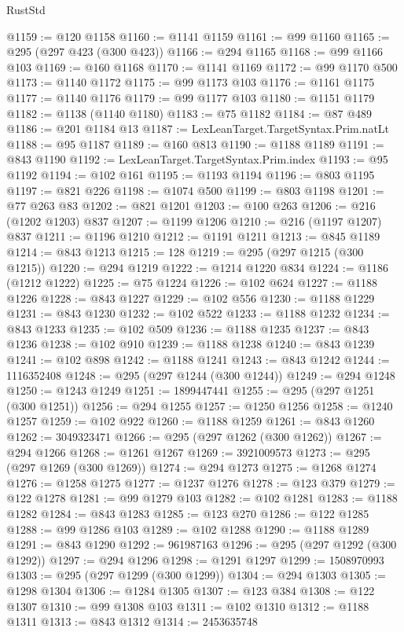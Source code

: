 \begin{lexlean}{RustStd}
\begin{coremodule}
@1159 := @120 @1158
@1160 := @1141 @1159
@1161 := @99 @1160
@1165 := @295 (@297 @423 (@300 @423))
@1166 := @294 @1165
@1168 := @99 @1166 @103
@1169 := @160 @1168
@1170 := @1141 @1169
@1172 := @99 @1170 @500
@1173 := @1140 @1172
@1175 := @99 @1173 @103
@1176 := @1161 @1175
@1177 := @1140 @1176
@1179 := @99 @1177 @103
@1180 := @1151 @1179
@1182 := @1138 (@1140 @1180)
@1183 := @75 @1182
@1184 := @87 @489
@1186 := @201 @1184 @13
@1187 := LexLeanTarget.TargetSyntax.Prim.natLt
@1188 := @95 @1187
@1189 := @160 @813
@1190 := @1188 @1189
@1191 := @843 @1190
@1192 := LexLeanTarget.TargetSyntax.Prim.index
@1193 := @95 @1192
@1194 := @102 @161
@1195 := @1193 @1194
@1196 := @803 @1195
@1197 := @821 @226
@1198 := @1074 @500
@1199 := @803 @1198
@1201 := @77 @263 @83
@1202 := @821 @1201
@1203 := @100 @263
@1206 := @216 (@1202 @1203) @837
@1207 := @1199 @1206
@1210 := @216 (@1197 @1207) @837
@1211 := @1196 @1210
@1212 := @1191 @1211
@1213 := @845 @1189
@1214 := @843 @1213
@1215 := 128
@1219 := @295 (@297 @1215 (@300 @1215))
@1220 := @294 @1219
@1222 := @1214 @1220 @834
@1224 := @1186 (@1212 @1222)
@1225 := @75 @1224
@1226 := @102 @624
@1227 := @1188 @1226
@1228 := @843 @1227
@1229 := @102 @556
@1230 := @1188 @1229
@1231 := @843 @1230
@1232 := @102 @522
@1233 := @1188 @1232
@1234 := @843 @1233
@1235 := @102 @509
@1236 := @1188 @1235
@1237 := @843 @1236
@1238 := @102 @910
@1239 := @1188 @1238
@1240 := @843 @1239
@1241 := @102 @898
@1242 := @1188 @1241
@1243 := @843 @1242
@1244 := 1116352408
@1248 := @295 (@297 @1244 (@300 @1244))
@1249 := @294 @1248
@1250 := @1243 @1249
@1251 := 1899447441
@1255 := @295 (@297 @1251 (@300 @1251))
@1256 := @294 @1255
@1257 := @1250 @1256
@1258 := @1240 @1257
@1259 := @102 @922
@1260 := @1188 @1259
@1261 := @843 @1260
@1262 := 3049323471
@1266 := @295 (@297 @1262 (@300 @1262))
@1267 := @294 @1266
@1268 := @1261 @1267
@1269 := 3921009573
@1273 := @295 (@297 @1269 (@300 @1269))
@1274 := @294 @1273
@1275 := @1268 @1274
@1276 := @1258 @1275
@1277 := @1237 @1276
@1278 := @123 @379
@1279 := @122 @1278
@1281 := @99 @1279 @103
@1282 := @102 @1281
@1283 := @1188 @1282
@1284 := @843 @1283
@1285 := @123 @270
@1286 := @122 @1285
@1288 := @99 @1286 @103
@1289 := @102 @1288
@1290 := @1188 @1289
@1291 := @843 @1290
@1292 := 961987163
@1296 := @295 (@297 @1292 (@300 @1292))
@1297 := @294 @1296
@1298 := @1291 @1297
@1299 := 1508970993
@1303 := @295 (@297 @1299 (@300 @1299))
@1304 := @294 @1303
@1305 := @1298 @1304
@1306 := @1284 @1305
@1307 := @123 @384
@1308 := @122 @1307
@1310 := @99 @1308 @103
@1311 := @102 @1310
@1312 := @1188 @1311
@1313 := @843 @1312
@1314 := 2453635748

\end{coremodule}
\end{lexlean}
